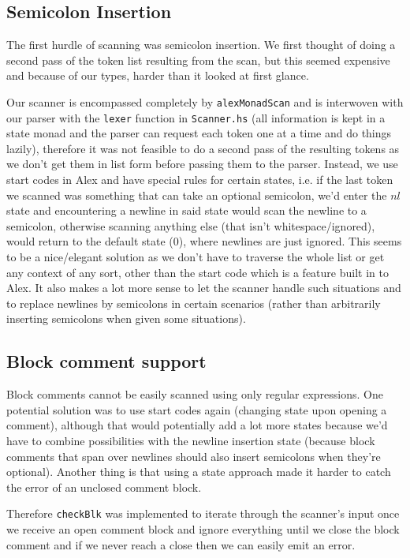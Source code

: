 \documentclass[11pt]{article}
\begin{document}
\subsection{Semicolon Insertion}
\label{sec:org9f3e72d}
The first hurdle of scanning was semicolon insertion. We first
thought of doing a second pass of the token list resulting from the
scan, but this seemed expensive and because of our types, harder
than it looked at first glance.

Our scanner is encompassed completely by \texttt{alexMonadScan}
and is interwoven with our parser with the \texttt{lexer} function in
\texttt{Scanner.hs} (all information is kept in a state monad and the
parser can request each token one at a time and do things lazily),
therefore it was not feasible to do a second pass of the resulting tokens as
we don't get them in list form before passing them to the
parser. Instead, we use start codes in Alex and have
special rules for certain states, i.e. if the last token we scanned
was something that can take an optional semicolon, we'd enter the
\(nl\) state and encountering a newline in said state would scan the
newline to a semicolon, otherwise scanning anything else (that
isn't whitespace/ignored), would return to the default state (\(0\)),
where newlines are just ignored. This seems to be a nice/elegant
solution as we don't have to traverse the whole list or get any
context of any sort, other than the start code which is a feature
built in to Alex. It also makes a lot more sense to let the scanner
handle such situations and to replace newlines by semicolons in
certain scenarios (rather than arbitrarily inserting semicolons
when given some situations).
\subsection{Block comment support}
\label{sec:orgc9aa876}
Block comments cannot be easily scanned using only regular
expressions. One potential solution was to use start codes again
(changing state upon opening a comment), although that would
potentially add a lot more states because we'd have to combine
possibilities with the newline insertion state (because block
comments that span over newlines should also insert semicolons when
they're optional). Another thing is that using a state approach
made it harder to catch the error of an unclosed comment block.

Therefore \texttt{checkBlk} was implemented to iterate through the
scanner's input once we receive an open comment block and ignore
everything until we close the block comment and if we never reach a
close then we can easily emit an error.
\end{document}
